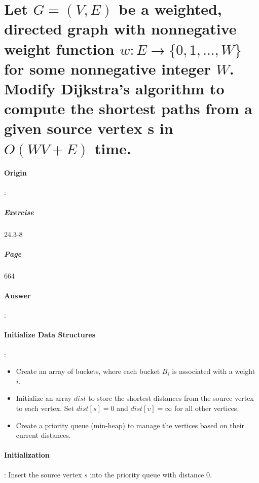 \documentclass{article}
\begin{document}
\section{Let $G = (V, E)$ be a weighted, directed graph with nonnegative weight function $w: E \rightarrow \{0, 1, \ldots, W\}$ for some nonnegative integer $W$. Modify Dijkstra's algorithm to compute the shortest paths from a given source vertex s in $O(WV + E)$ time.}

\paragraph{Origin}:
  \subparagraph{Exercise}24.3-8
  \subparagraph{Page}664
\paragraph{Answer}:
 


\paragraph{Initialize Data Structures}:

\begin{itemize}
  \item Create an array of buckets, where each bucket \(B_i\) is associated with a weight \(i\).
  \item Initialize an array \(dist\) to store the shortest distances from the source vertex to each vertex. Set \(dist[s] = 0\) and \(dist[v] = \infty\) for all other vertices.
  \item Create a priority queue (min-heap) to manage the vertices based on their current distances.
\end{itemize}


\paragraph{Initialization}:
  Insert the source vertex \(s\) into the priority queue with distance \(0\).
\end{document}
